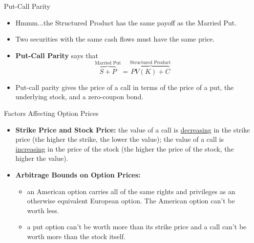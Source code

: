 \documentclass{beamer}
\begin{document}
\begin{frame}{Put-Call Parity}
\begin{itemize}
\item Hmmm...the Structured Product  has the same payoff as the Married Put. 
\item Two securities with the same cash flows must have the same price. 
\item \textbf{Put-Call Parity} says that
\begin{equation*}
\overbrace{S+P}^{\text{Married Put}}=\overbrace{PV(K)+C}^{\text{Structured Product}}
\end{equation*}
\item Put-call parity gives the price of a call in terms of the price of a put, the underlying stock, and a zero-coupon bond. 
\end{itemize}
\end{frame}

\begin{frame}{Factors Affecting Option Prices}
\begin{itemize}
\item \textbf{Strike Price and Stock Price:} the value of a call is \underline{decreasing} in the strike price (the higher the strike, the lower the value); the value of a call is \underline{increasing} in the price of the stock (the higher the price of the stock, the higher the value). 
\item \textbf{Arbitrage Bounds on Option Prices:} 
\begin{itemize}
\item an American option carries all of the same rights and privileges as an otherwise equivalent European option. The American option can't be worth less. 
\item a put option can't be worth more than its strike price and a call can't be worth more than the stock itself.
\end{itemize}
\end{itemize}
\end{frame}
\end{document}
